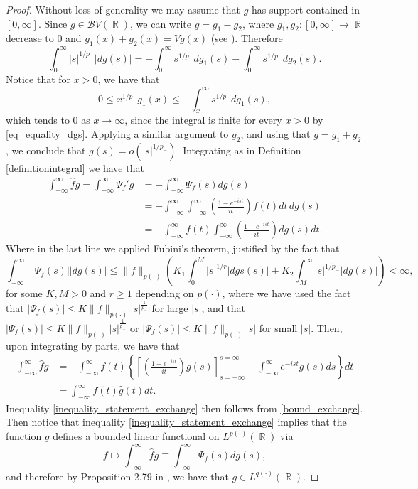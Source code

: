\documentclass[11pt,reqno]{amsart}
\theoremstyle{definition}
\theoremstyle{definition}
\theoremstyle{definition}
\DeclareMathOperator{\R}{\mathbb{R}}
\newcommand{\p}{p(\cdot)}
\newcommand{\q}{q(\cdot)}
\newcommand{\Lp}{L^{\p}(\R)}
\newcommand{\BV}{\mathcal{B}V}
\begin{document}
\begin{proof}
    Without loss of generality we may assume that $g$ has support contained in $[0,\infty]$. Since $g\in\BV(\R)$, we can write $g=g_1-g_2$, where $g_1,g_2:[0,\infty]\to \R$ decrease to $0$ and $g_1(x)+g_2(x)=Vg(x)$ (see \cite{Cruz-Uribe-Stieltjes}). Therefore 
    \begin{equation}\label{eq_equality_dgs}
\int_{0}^{\infty}|s|^{1/p_{-}}|dg(s)|=-\int_0^{\infty}s^{1/p_{-}}dg_1(s)-\int_0^\infty s^{1/p_{-}}dg_2(s).
    \end{equation}
    Notice that %
    for $x>0$, we have that
    \begin{equation*}
        0\leq x^{1/p_{-}}g_1(x)\leq -\int_x^\infty s^{1/p_{-}}dg_1(s),
    \end{equation*}
    which tends to 0  as $x\to\infty$,
    since the integral is finite for every $x>0$ by \eqref{eq_equality_dgs}.
    Applying a similar argument to $g_2$, and using that $g=g_1+g_2$, we conclude that $g(s)=o(|s|^{1/p_{-}})$. Integrating as in Definition \ref{definitionintegral} we have that
    \begin{align*}
        \int_{-\infty}^\infty\widehat{f}g=\int_{-\infty}^\infty\Psi_f'g&=-\int_{-\infty}^\infty\Psi_f(s)dg(s)\\
        &=-\int_{-\infty}^\infty\int_{-\infty}^\infty\left(\frac{1-e^{-ist}}{it}\right)f(t){d}t\, dg(s)\\
        &=-\int_{-\infty}^\infty f(t)\int_{-\infty}^\infty\left(\frac{1-e^{-ist}}{it}\right)dg(s)dt.
    \end{align*}
    Where in the last line we applied Fubini's theorem,  justified by the fact that
\begin{equation}\label{bound_exchange}
        \int_{-\infty}^\infty|\Psi_f(s)||dg(s)|\leq \|f\|_{\p}\left(K_1\int_0^M|s|^{1/r}|dgs(s)|+K_2\int_{M}^{\infty}|s|^{1/p_{-}}|dg(s)|\right)<\infty,
    \end{equation}
    for some $K,M>0$ and $r\geq 1$ depending on $\p$, where we have used the fact that $|\Psi_f(s)|\leq K\|f\|_{\p}|s|^{\frac{1}{p_{-}}}$ for large $|s|$, and that $|\Psi_f(s)|\leq K\|f\|_{\p}|s|^{\frac{1}{p_{+}}}$ or $|\Psi_f(s)|\leq K\|f\|_{\p}|s|$ for small $|s|$. 
    Then, upon integrating by parts, we have that
    \begin{align*}
        \int_{-\infty}^\infty\widehat{f}g&=-\int_{-\infty}^\infty f(t)\left\{\left[\left(\frac{1-e^{-ist}}{it}\right)g(s)\right]_{s=-\infty}^{s=\infty}-\int_{-\infty}^\infty e^{-ist}g(s)ds\right\}dt\\
        &=\int_{-\infty}^{\infty}f(t)\widehat{g}(t)dt.
    \end{align*}
    Inequality \eqref{inequality_statement_exchange} then follows from \eqref{bound_exchange}. Then notice that inequality \eqref{inequality_statement_exchange} implies that the function $g$ defines a bounded linear functional on $\Lp$ via 
    \begin{equation*}
        f\mapsto\int_{-\infty}^\infty\widehat{f}g\equiv\int_{-\infty}^\infty\Psi_f(s)dg(s),
    \end{equation*}and therefore by Proposition 2.79 in \cite{Cruz-Uribe}, we have that $g\in L^{\q}(\R)$.
\end{proof}
\end{document}
